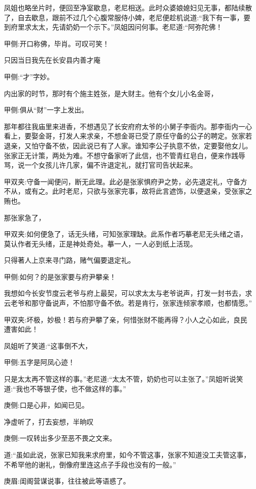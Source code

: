 \begin{parag}
    凤姐也略坐片时，便回至净室歇息，老尼相送。此时众婆娘媳妇见无事，都陆续散了，自去歇息，跟前不过几个心腹常服侍小婢，老尼便趁机说道:“我下有一事，要到府里求太太，先请奶奶一个示下。”凤姐因问何事。老尼道:“阿弥陀佛！\begin{note}甲侧:开口称佛，毕肖。可叹可笑！\end{note}只因当日我先在长安县内善才庵\begin{note}甲侧:“才”字妙。\end{note}内出家的时节，那时有个施主姓张，是大财主。他有个女儿小名金哥，\begin{note}甲侧:俱从“财”一字上发出。\end{note}那年都往我庙里来进香，不想遇见了长安府府太爷的小舅子李衙内。那李衙内一心看上，要娶金哥，打发人来求亲，不想金哥已受了原任守备的公子的聘定。张家若退亲，又怕守备不依，因此说已有了人家。谁知李公子执意不依，定要娶他女儿。张家正无计策，两处为难。不想守备家听了此信，也不管青红皂白，便来作践辱骂，说一个女孩儿许几家，偏不许退定礼，就打官司告状起来。\begin{note}甲双夹:守备一闻便问，断无此理。此必是张家惧府尹之势，必先退定礼，守备方不从，或有之。此时老尼，只欲与张家完事，故将此言遮饰，以便退亲，受张家之贿也。\end{note}那张家急了，\begin{note}甲双夹:如何便急了，话无头绪，可知张家理缺。此系作者巧摹老尼无头绪之语，莫认作者无头绪，正是神处奇处。摹一人，一人必到纸上活现。\end{note}只得著人上京来寻门路，赌气偏要退定礼。\begin{note}甲侧:如何？的是张家要与府尹攀亲！\end{note}我想如今长安节度云老爷与府上最契，可以求太太与老爷说声，打发一封书去，求云老爷和那守备说声，不怕那守备不依。若是肯行，张家连倾家孝顺，也都情愿。”\begin{note}甲双夹:坏极，妙极！若与府尹攀了亲，何惜张财不能再得？小人之心如此，良民遭害如此！\end{note}
\end{parag}


\begin{parag}
    凤姐听了笑道:“这事倒不大，\begin{note}甲侧:五字是阿凤心迹！\end{note}只是太太再不管这样的事。”老尼道:“太太不管，奶奶也可以主张了。”凤姐听说笑道:“我也不等银子使，也不做这样的事。”\begin{note}庚侧:口是心非，如闻已见。\end{note}净虚听了，打去妄想，半晌叹\begin{note}庚侧:一叹转出多少至恶不畏之文来。\end{note}道:“虽如此说，张家已知我来求府里，如今不管这事，张家不知道没工夫管这事，不希罕他的谢礼，倒像府里连这点子手段也没有的一般。”\begin{note}庚眉:闺阁营谋说事，往往被此等语惑了。\end{note}
\end{parag}



